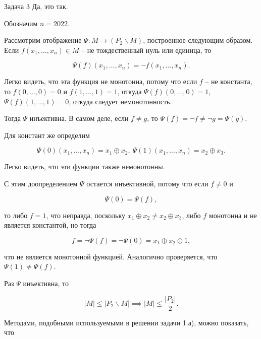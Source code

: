 \documentclass{article}
\newcommand{\abs}[1]{\left\lvert#1\right\rvert}
\renewcommand{\setminus}{\mathbin{\backslash}}
\begin{document}
	\begin{section}{Задача 3}
		Да, это так.

		Обозначим $n = 2022$.

		Рассмотрим отображение $\Psi: M \to (P_2 \setminus M)$, построенное следующим образом. Если $f(x_1, \dots, x_n) \in M$ -- не тождественный нуль или единица, то

		\begin{equation*}
			\Psi(f)(x_1, \dots, x_n) = \neg f(x_1, \dots, x_n).
		\end{equation*}

		Легко видеть, что эта функция не монотонна, потому что если $f$ -- не константа, то $f(0, \dots, 0) = 0$ и $f(1, \dots, 1) = 1$, откуда $\Psi(f)(0, \dots, 0) = 1$, $\Psi(f)(1, \dots, 1) = 0$, откуда следует немонотонность.

		Тогда $\Psi$ инъективна. В самом деле, если $f \ne g$, то $\Psi(f) = \neg f \ne \neg g = \Psi(g)$.

		Для констант же определим

		\begin{equation*}
			\Psi(0)(x_1, \dots, x_n) = x_1 \oplus x_2, \ \Psi(1)(x_1, \dots, x_n) = x_2 \oplus x_3.
		\end{equation*}

		Легко видеть, что эти функции также немонотонны.

		С этим доопределением $\Psi$ остается инъективной, потому что если $f \ne 0$ и

		\begin{equation*}
			\Psi(0) = \Psi(f),
		\end{equation*}

		то либо $f = 1$, что неправда, поскольку $x_1 \oplus x_2 \ne x_2 \oplus x_3$, либо $f$ монотонна и не является константой, но тогда

		\begin{equation*}
			f = \neg \Psi(f) = \neg \Psi(0) = x_1 \oplus x_2 \oplus 1,
		\end{equation*}

		что не является монотонной функцией. Аналогично проверяется, что $\Psi(1) \ne \Psi(f)$.

		Раз $\Psi$ инъективна, то

		\begin{equation*}
			\abs{M} \le \abs{P_2 \setminus M} \implies \abs{M} \le \frac{\abs{P_2}}{2}.
		\end{equation*}

		Методами, подобными используемыми в решении задачи 1.а), можно показать, что


\end{section}
\end{document}
